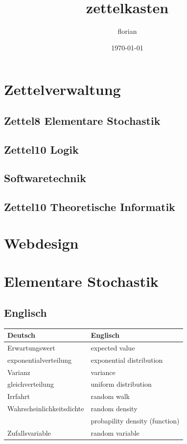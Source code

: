 \documentclass[11pt]{article}
\title{zettelkasten}
\author{florian}
\date{\today}
\begin{document}
\maketitle

\setcounter{tocdepth}{3}
\tableofcontents
\vspace*{1cm}


\section{Zettelverwaltung}
\label{sec-1}
\subsection{\textbf{Zettel8} \textbf{Elementare Stochastik}}
\label{sec-1-1}
\subsection{\textbf{Zettel1}0 \textbf{Logik}}
\label{sec-1-2}
\subsection{\textbf{Softwaretechnik}}
\label{sec-1-3}
\subsection{\textbf{Zettel1}0 \textbf{Theoretische Informatik}}
\label{sec-1-4}
\section{Webdesign}
\label{sec-2}
\section{Elementare Stochastik}
\label{sec-3}
\subsection{Englisch}
\label{sec-3-1}


\begin{center}
\begin{tabular}{ll}
 Deutsch                    &  Englisch                        \\
\hline
 Erwartungswert             &  expected value                  \\
 exponentialverteilung      &  exponential distribution        \\
 Varianz                    &  variance                        \\
 gleichverteilung           &  uniform distribution            \\
 Irrfahrt                   &  random walk                     \\
 Wahrscheinlichkeitsdichte  &  random density                  \\
                            &  probapility density (function)  \\
 Zufallsvariable            &  random variable                 \\
\end{tabular}
\end{center}
\end{document}
